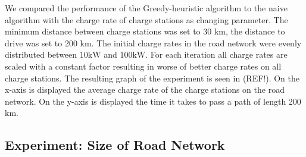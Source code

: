 We compared the performance of the Greedy-heuristic algorithm to the naive algorithm with the charge rate of charge stations as changing parameter. The minimum distance between charge stations was set to 30 km, the distance to drive was set to 200 km. The initial charge rates in the road network were evenly distributed between $10 \si{\kW}$ and $100 \si{\kW}$. For each iteration all charge rates are scaled with a constant factor resulting in worse of better charge rates on all charge stations. The resulting graph of the experiment is seen in (REF!). On the x-axis is displayed the average charge rate of the charge stations on the road network. On the y-axis is displayed the time it takes to pass a path of length 200 km. 

\subsection{Experiment: Size of Road Network}

